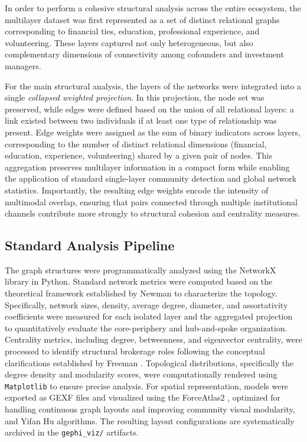 \documentclass[conference]{IEEEtran}
\begin{document}
In order to perform a cohesive structural analysis across the entire ecosystem, the multilayer dataset was first represented as a set of distinct relational graphs corresponding to financial ties, education, professional experience, and volunteering. These layers captured not only heterogeneous, but also complementary dimensions of connectivity among cofounders and investment managers.

For the main structural analysis, the layers of the networks were integrated into a single \textit{collapsed weighted projection}. In this projection, the node set was preserved, while edges were defined based on the union of all relational layers: a link existed between two individuals if at least one type of relationship was present. Edge weights were assigned as the sum of binary indicators across layers, corresponding to the number of distinct relational dimensions (financial, education, experience, volunteering) shared by a given pair of nodes. This aggregation preserves multilayer information in a compact form while enabling the application of standard single-layer community detection and global network statistics. Importantly, the resulting edge weights encode the intensity of multimodal overlap, ensuring that pairs connected through multiple institutional channels contribute more strongly to structural cohesion and centrality measures.

\subsection{Standard Analysis Pipeline}

The graph structures were programmatically analyzed using the NetworkX library in Python. Standard network metrics were computed based on the theoretical framework established by Newman \cite{newman2018networks} to characterize the topology. Specifically, network sizes, density, average degree, diameter, and assortativity coefficients were measured for each isolated layer and the aggregated projection to quantitatively evaluate the core-periphery and hub-and-spoke organization. Centrality metrics, including degree, betweenness, and eigenvector centrality, were processed to identify structural brokerage roles following the conceptual clarifications established by Freeman \cite{freeman1978centrality}. Topological distributions, specifically the degree density and modularity scores, were computationally rendered using \texttt{Matplotlib} to ensure precise analysis. For spatial representation, models were exported as GEXF files and visualized using the ForceAtlas2 \cite{jacomy2014forceatlas2}, optimized for handling continuous graph layouts and improving community visual modularity, and Yifan Hu \cite{hu2005} algorithms. The resulting layout configurations are systematically archived in the \texttt{gephi\_viz/} artifacts.
\end{document}
